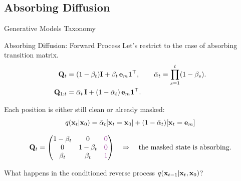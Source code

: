 \documentclass{beamer}
\renewcommand{\eqpause}{}
\begin{document}
\subsection{Absorbing Diffusion}
\begin{frame}{Generative Models Taxonomy}
\end{frame}
\begin{frame}{Absorbing Diffusion: Forward Process}
	Let's restrict to the case of absorbing transition matrix.
	\vspace{-0.3cm}
	\begin{align*}
		\mathbf{Q}_t &= (1-\beta_t)\mathbf{I} + \beta_t\, \mathbf{e}_m \mathbf{1}^\top,
		\qquad
		\bar\alpha_t = \prod_{s=1}^t (1-\beta_s). \\
		\mathbf{Q}_{1:t} &= \bar\alpha_t\,\mathbf{I} + (1-\bar\alpha_t)\,\mathbf{e}_m \mathbf{1}^\top.
	\end{align*}
	\eqpause
	Each position is either still clean or already masked:
	\[
		q(\mathbf{x}_t | \mathbf{x}_0) = \bar\alpha_t [\mathbf{x}_t = \mathbf{x}_0] + (1 - \bar\alpha_t) [\mathbf{x}_t = \mathbf{e}_m]
	\]
	\eqpause
	\[
		\mathbf{Q}_t =
		\begin{pmatrix}
			1-\beta_t & 0           & \color{violet}{0} \\
			0           & 1-\beta_t & \color{violet}{0} \\
			\beta_t     & \beta_t     & \color{violet}{1}
		\end{pmatrix} 
		\quad \Rightarrow \quad 
		\text{the masked state is absorbing.}
	\]
	\eqpause
	What happens in the conditioned reverse process
	$q(\mathbf{x}_{t-1} | \mathbf{x}_t, \mathbf{x}_0)$?
\end{frame}
\end{document}
